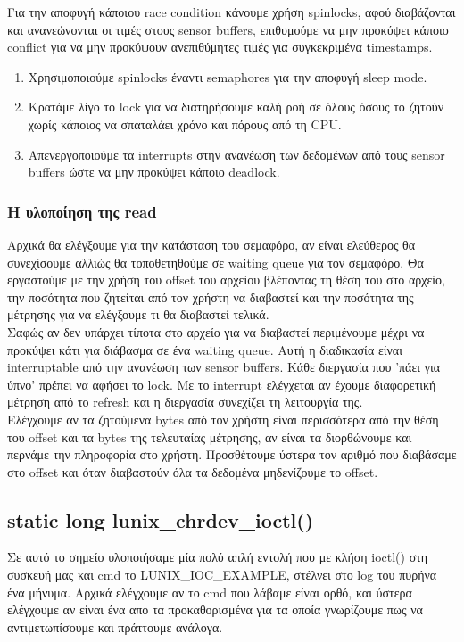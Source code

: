 \documentclass{article}
\begin{document}
Για την αποφυγή κάποιου race condition κάνουμε χρήση spinlocks, αφού διαβάζονται και ανανεώνονται
οι τιμές στους sensor buffers, επιθυμούμε να μην προκύψει κάποιο conflict για να μην προκύψουν 
ανεπιθύμητες τιμές για συγκεκριμένα timestamps. 
\begin{enumerate}
\item{Χρησιμοποιούμε spinlocks έναντι semaphores για την αποφυγή sleep mode.}
\item{Κρατάμε λίγο το lock για να διατηρήσουμε καλή ροή σε όλους όσους το
    ζητούν χωρίς κάποιος να σπαταλάει χρόνο και πόρους από τη CPU.}
\item{Απενεργοποιούμε τα interrupts στην
    ανανέωση των δεδομένων από τους sensor buffers ώστε να μην προκύψει κάποιο deadlock.}
\end{enumerate}

\subsubsection{Η υλοποίηση της read}
Αρχικά θα ελέγξουμε για την κατάσταση του σεμαφόρο, αν είναι ελεύθερος θα συνεχίσουμε αλλιώς
θα τοποθετηθούμε σε waiting queue για τον σεμαφόρο. Θα εργαστούμε με την χρήση του offset του
αρχείου βλέποντας τη θέση του στο αρχείο, την ποσότητα που ζητείται από τον χρήστη να διαβαστεί
και την ποσότητα της μέτρησης για να ελέγξουμε τι θα διαβαστεί τελικά. \\
Σαφώς αν δεν υπάρχει τίποτα στο αρχείο για να διαβαστεί περιμένουμε μέχρι να προκύψει κάτι για
διάβασμα σε ένα waiting queue. Αυτή η διαδικασία είναι interruptable από την ανανέωση των sensor
buffers. Κάθε διεργασία που 'πάει για ύπνο' πρέπει να αφήσει το lock. Με το interrupt ελέγχεται
αν έχουμε διαφορετική μέτρηση από το refresh και η διεργασία συνεχίζει τη λειτουργία της. \\
Ελέγχουμε αν τα ζητούμενα bytes από τον χρήστη είναι περισσότερα από την θέση του offset και τα
bytes της τελευταίας μέτρησης, αν είναι τα διορθώνουμε και περνάμε την πληροφορία στο χρήστη.
Προσθέτουμε ύστερα τον αριθμό που διαβάσαμε στο offset και όταν διαβαστούν όλα τα δεδομένα 
μηδενίζουμε το offset. \\
\subsection{static long lunix\_chrdev\_ioctl()}
Σε αυτό το σημείο υλοποιήσαμε μία πολύ απλή εντολή που με κλήση ioctl() στη συσκευή μας και cmd το
LUNIX\_IOC\_EXAMPLE, στέλνει στο log του πυρήνα ένα μήνυμα. Αρχικά ελέγχουμε αν το cmd που λάβαμε είναι
ορθό, και ύστερα ελέγχουμε αν είναι ένα απο τα προκαθορισμένα για τα οποία γνωρίζουμε πως να αντιμετωπίσουμε
και πράττουμε ανάλογα.
\end{document}
